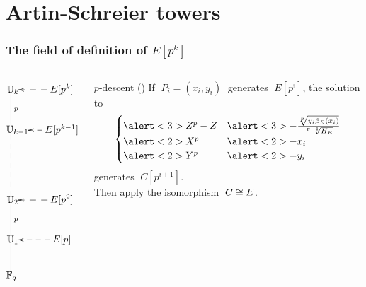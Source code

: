 \documentclass[10pt,usepdftitle=false]{beamer}
\begin{document}

\section{Artin-Schreier towers}

\begin{frame}
  \frametitle{The field of definition of $E[p^k]$}
  
  \begin{columns}
    \begin{column}{0.3\textwidth}
      \large\[\xymatrix@C=20pt{
        *[r]{\U_k} \ar@{-}[d]^p & E[p^k] \ar@{-->}[l]\\
        *[r]{\U_{k-1}} \ar@{--}[dd] & E[p^{k-1}] \ar@{-->}[l]\\
        \\
        *[r]{\U_2} \ar@{-}[d]^p & E[p^2] \ar@{-->}[l]\\
        *[r]{\U_1} \ar@{-}[d] & E[p] \ar@{-->}[l]\\
        *[r]{\F_q}
      }\]
    \end{column}
    \begin{column}{0.65\textwidth}
      \begin{center}
      \end{center}
      \begin{block}{$p$-descent (\cite{voloch90})}
        If $\;P_i=(x_i,y_i)\;$ generates $\;E[p^i]$, the solution to
        \begin{equation*}
          \begin{cases}
            \alert<3>{Z^p - Z} &\alert<3>{- \frac{\sqrt[p]{y_i\beta_E(x_i)}}{\sqrt[p-1]{H_E}}}\\
            \alert<2>{X^p} &\alert<2>{- x_i}\\
            \alert<2>{Y^p} &\alert<2>{- y_i}
          \end{cases}
        \end{equation*}
        generates $\;C[p^{i+1}]$.\\
        \alert<4>{Then apply the isomorphism $\;C\cong E$}.
      \end{block}
    \end{column}
  \end{columns}
\end{frame}
\end{document}
